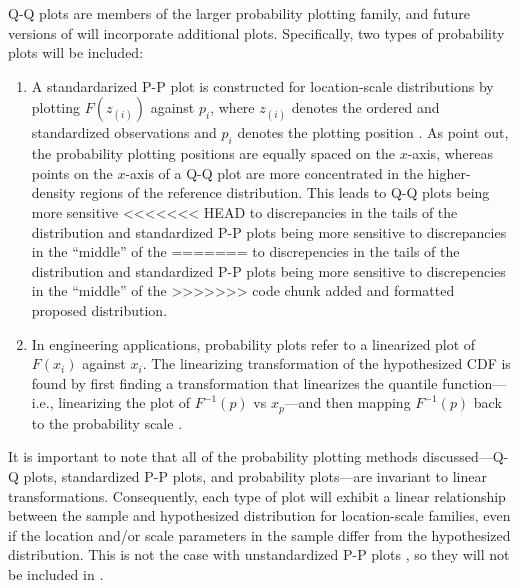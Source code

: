 Q-Q plots are members of the larger probability plotting family, and
future versions of  will incorporate additional plots.
Specifically, two types of probability plots will be included:

\begin{enumerate}
\def\labelenumi{\arabic{enumi}.}
\tightlist
\item
  A standardarized P-P plot is constructed for location-scale
  distributions by plotting \(F(z_{(i)})\) against \(p_i\), where
  \(z_{(i)}\) denotes the ordered and standardized observations and
  \(p_i\) denotes the plotting position \citep{Gan1991-yk}. As
  \citet{Gan1991-yk} point out, the probability plotting positions are
  equally spaced on the \(x\)-axis, whereas points on the \(x\)-axis of
  a Q-Q plot are more concentrated in the higher-density regions of the
  reference distribution. This leads to Q-Q plots being more sensitive
<<<<<<< HEAD
  to discrepancies in the tails of the distribution and standardized P-P
  plots being more sensitive to discrepancies in the ``middle'' of the
=======
  to discrepencies in the tails of the distribution and standardized P-P
  plots being more sensitive to discrepencies in the ``middle'' of the
>>>>>>> code chunk added and formatted
  proposed distribution.
\item
  In engineering applications, probability plots refer to a linearized
  plot of \(F(x_i)\) against \(x_i\). The linearizing transformation of
  the hypothesized CDF is found by first finding a transformation that
  linearizes the quantile function---i.e., linearizing the plot of
  \(F^{-1}(p)\) vs \(x_p\)---and then mapping \(F^{-1}(p)\) back to the
  probability scale \citep[cf.][Chapter 6]{Meeker1998}.
\end{enumerate}

It is important to note that all of the probability plotting methods
discussed---Q-Q plots, standardized P-P plots, and probability
plots---are invariant to linear transformations. Consequently, each type
of plot will exhibit a linear relationship between the sample and
hypothesized distribution for location-scale families, even if the
location and/or scale parameters in the sample differ from the
hypothesized distribution. This is not the case with unstandardized P-P
plots \citep{Wilk1968-ii}, so they will not be included in
.

